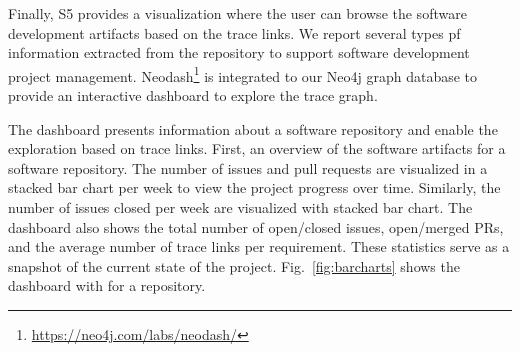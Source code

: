 Finally, \textsf{S5} provides a visualization where the user can browse the software development artifacts based on the trace links. 
We report several types pf information extracted from the repository to support software development project management. 
Neodash\footnote{\url{https://neo4j.com/labs/neodash/}} is integrated to our Neo4j graph database to provide an interactive dashboard to explore the trace graph.

The dashboard presents information about a software repository and enable the exploration based on trace links.
First, an overview of the software artifacts for a software repository.  
The number of issues and pull requests are visualized in a stacked bar chart per week to view the project progress over time. 
Similarly, the number of  issues closed per week are visualized with stacked bar chart. 
The dashboard also shows the total number of open/closed issues, open/merged PRs, and the average number of trace links per requirement. 
These statistics serve as a snapshot of the current state of the project. 
Fig.~\ref{fig:barcharts} shows the dashboard with for a repository.





